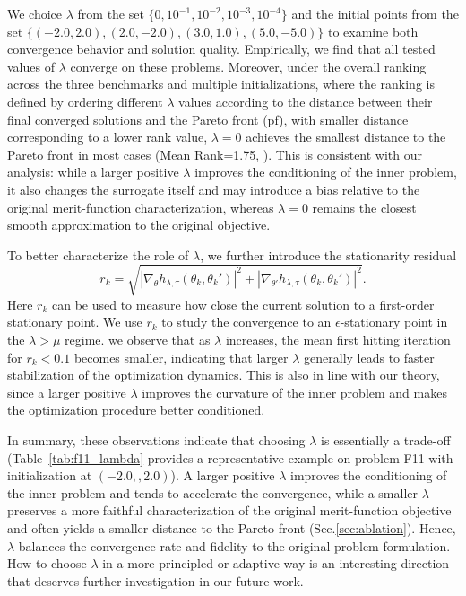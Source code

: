 \documentclass[sigconf]{acmart}
\begin{document}
\begin{add}
We choice $\lambda$ from the set $\{0, 10^{-1}, 10^{-2}, 10^{-3}, 10^{-4}\}$ and the initial points from the set $\{(-2.0,2.0), (2.0,-2.0), (3.0,1.0),(5.0,-5.0)\}$ to examine both convergence behavior and solution quality.
Empirically, we find that all tested values of $\lambda$ converge on these problems. Moreover, under the overall ranking across the three benchmarks and multiple initializations, where the ranking is defined by ordering different $\lambda$ values according to the distance between their final converged solutions and the Pareto front (pf), with smaller distance corresponding to a lower rank value, $\lambda=0$ achieves the smallest distance to the Pareto front in most cases (Mean Rank=1.75, ). This is consistent with our analysis: while a larger positive $\lambda$ improves the conditioning of the inner problem, it also changes the surrogate itself and may introduce a bias relative to the original merit-function characterization, whereas $\lambda=0$ remains the closest smooth approximation to the original objective.

To better characterize the role of $\lambda$, we further introduce the stationarity residual $$ r_k=\sqrt{|\nabla_{\theta} h_{\lambda,\tau}(\theta_k,\theta_k')|^2+|\nabla_{\theta'} h_{\lambda,\tau}(\theta_k,\theta_k')|^2 }.$$ Here $r_k$ can be used to measure how close the current solution to a first-order stationary point. We use $r_k$ to study the convergence to an $\epsilon$-stationary point in the $\lambda> \bar\mu$ regime.  we observe that as $\lambda$ increases, the mean first hitting iteration for $r_k<0.1$ becomes smaller, indicating that larger $\lambda$ generally leads to faster stabilization of the optimization dynamics. This is also in line with our theory, since a larger positive $\lambda$ improves the curvature of the inner problem and makes the optimization procedure better conditioned.

In summary, these observations indicate that choosing $\lambda$ is essentially a trade-off (Table~\ref{tab:f11_lambda} provides a representative example on problem F11 with initialization at $(-2.0,, 2.0)$). A larger positive $\lambda$ improves the conditioning of the inner problem and tends to accelerate the convergence, while a smaller $\lambda$ preserves a more faithful characterization of the original merit-function objective and often yields a smaller distance to the Pareto front (Sec.\ref{sec:ablation}). Hence, $\lambda$ balances the convergence rate and fidelity to the original problem formulation. How to choose $\lambda$ in a more principled or adaptive way is an interesting direction that deserves further investigation in our future work.





\end{add}
\end{document}
